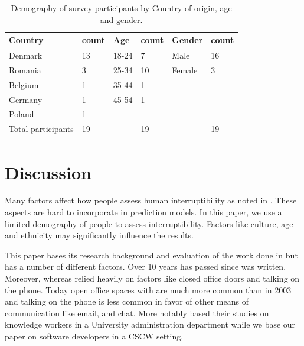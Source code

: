 \documentclass{sigchi}
\begin{document}
\begin{table}[h]
  \centering
    \begin{tabular}{@{}llllll@{}}
    \toprule
    \textbf{Country}        & count & \textbf{Age} & count & \textbf{Gender} & count \\ \midrule
    Denmark                 & 13    & 18-24        & 7     & Male            & 16    \\
    Romania                 & 3     & 25-34        & 10    & Female          & 3     \\
    Belgium                 & 1     & 35-44        & 1     &                 &       \\
    Germany                 & 1     & 45-54        & 1     &                 &       \\
    Poland                  & 1     &              &       &                 &       \\
    Total participants      & 19    &              & 19    &                 & 19    \\ \bottomrule
    \end{tabular}
    \caption{Demography of survey participants by Country of origin, age and gender.}
    \label{fig:demography}
\end{table}

\section{Discussion}
Many factors affect how people assess human interruptibility as noted in \cite{Avrahami2007}.
These aspects are hard to incorporate in prediction models.
In this paper, we use a limited demography of people to assess interruptibility.
Factors like culture, age and ethnicity may significantly influence the results.

This paper bases its research background and evaluation of the work done in \cite{fogarty2005predicting} but has a number of different factors.
Over 10 years has passed since \cite{fogarty2005predicting} was written.
Moreover, whereas \cite{fogarty2005predicting} relied heavily on factors like closed office doors and talking on the phone.
Today open office spaces with are much more common than in 2003 and talking on the phone is less common in favor of other means of communication like email, and chat.
More notably \cite{fogarty2005predicting} based their studies on knowledge workers in a University administration department while we base our paper on software developers in a CSCW setting.
\end{document}

